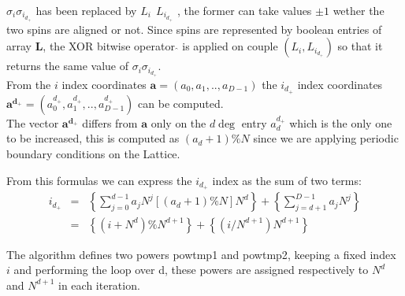 \documentclass[11pt,a4paper]{article}
\begin{document}
$\sigma_i\sigma_{i_{d_+}}$ has been replaced by $L_i \ \hat{} \ L_{i_{d_+}}$ , the former can take values $\pm1$ wether the two spins are aligned or not. Since spins are represented by boolean entries of array $\mathbf{L}$, the XOR bitwise operator $\hat{}$ is applied on couple $(L_i,L_{i_{d_+}})$ so that it returns the same value of $\sigma_i\sigma_{i_{d_+}}$. \\
\vspace{0.1cm}
From the $i$ index coordinates $\mathbf{a} = (a_0,a_1,..,a_{D-1})$ the $i_{d_+}$ index coordinates
$\mathbf{a^{d_+}} = (a^{d_+}_0,a^{d_+}_1,..,a^{d_+}_{D-1})$ can be computed. \\
The vector $\mathbf{a^{d_+}}$ differs from $\mathbf{a}$
only on the $d\deg$ entry $a^{d_+}_d$ which is the only one to be increased, this is computed as $(a_d+1)\%N$ since we are applying periodic boundary conditions on the Lattice.

From this formulas we can express the $i_{d_+}$ index as the sum of two terms:
\begin{eqnarray*}
  i_{d_+} &=& \left\{ \sum_{j = 0}^{d-1}a_jN^j  [(a_d + 1)\%N]N^d \right\} + \left\{ \sum_{j = d+1}^{D-1}a_jN^j \right\}  \\
          &=& \left\{(i + N^d)\%N^{d+1} \right\}  +  \left\{ (i/N^{d+1})N^{d+1}  \right\}
\end{eqnarray*}

The algorithm defines two powers \textsf{pow\textunderscore tmp1} and \textsf{pow\textunderscore tmp2}, keeping a fixed index $i$ and performing the loop over d, these powers are assigned respectively to $N^d$ and $N^{d+1}$ in each iteration.

\newpage






%   
\end{document}
